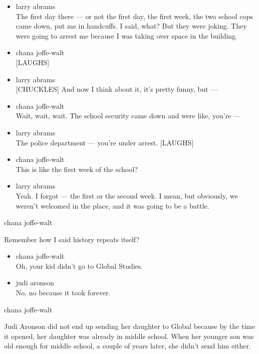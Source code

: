 \begin{itemize}
\item
  larry abrams\\
  The first day there --- or not the first day, the first week, the two
  school cops came down, put me in handcuffs. I said, what? But they
  were joking. They were going to arrest me because I was taking over
  space in the building.
\item
  chana joffe-walt\\
  {[}LAUGHS{]}
\item
  larry abrams\\
  {[}CHUCKLES{]} And now I think about it, it's pretty funny, but ---
\item
  chana joffe-walt\\
  Wait, wait, wait. The school security came down and were like, you're
  ---
\item
  larry abrams\\
  The police department --- you're under arrest. {[}LAUGHS{]}
\item
  chana joffe-walt\\
  This is like the first week of the school?
\item
  larry abrams\\
  Yeah. I forgot --- the first or the second week. I mean, but
  obviously, we weren't welcomed in the place, and it was going to be a
  battle.
\end{itemize}

chana joffe-walt

Remember how I said history repeats itself?

\begin{itemize}
\item
  chana joffe-walt\\
  Oh, your kid didn't go to Global Studies.
\item
  judi aronson\\
  No, no because it took forever.
\end{itemize}

chana joffe-walt

Judi Aronson did not end up sending her daughter to Global because by
the time it opened, her daughter was already in middle school. When her
younger son was old enough for middle school, a couple of years later,
she didn't send him either.

